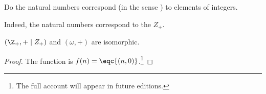 

Do the natural numbers correspond (in the sense ) to elements of integers.


Indeed, the natural numbers correspond to the $Z_+$.

\begin{proposition}
  $(\Z_+, +\mid Z_+)$ and $(\omega, +)$ are isomorphic.
\end{proposition}
\begin{proof}
  The function is $f(n) = \eqc{(n, 0)}$.\footnote{The full account will appear in future editions.}
\end{proof}

\blankpage

